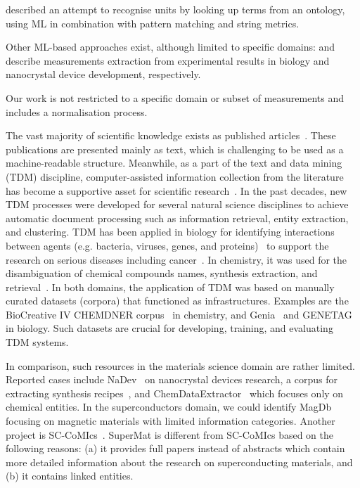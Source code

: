 \documentclass[12pt, a4paper]{report}
\begin{document}
\cite{berrahou2013extract} described an attempt to recognise units by looking up terms from an ontology, using ML in combination with pattern matching and string metrics. 

Other ML-based approaches exist, although limited to specific domains: \cite{kang_extracting_2013} and \cite{dieb2015framework} describe measurements extraction from experimental results in biology and nanocrystal device development, respectively. 

Our work is not restricted to a specific domain or subset of measurements and includes a normalisation process. 


The vast majority of scientific knowledge exists as published articles~\cite{Grigas2017JustGI, Khabsa2014TheNO, OrduaMalea2015MethodsFE, Bjrk2009ScientificJP}. 
These publications are presented mainly as text, which is challenging to be used as a machine-readable structure. 
Meanwhile, as a part of the text and data mining (TDM) discipline, computer-assisted information collection from the literature has become a supportive asset for scientific research~\cite{doi:10.1063/5.0021106}. 
In the past decades, new TDM processes were developed for several natural science disciplines to achieve automatic document processing such as information retrieval, entity extraction, and clustering.  
TDM has been applied in biology for identifying interactions between agents (e.g. bacteria, viruses, genes, and proteins)~\cite{10.1371/journal.pone.0004554, Krallinger2010, Krallinger2009ExtractionOH} to support the research on serious diseases including cancer~\cite{Krasnitz2019CancerB}. 
In chemistry, it was used for the disambiguation of chemical compounds names, synthesis extraction, and retrieval~\cite{Hawizy2011ChemicalTaggerAT}.
In both domains, the application of TDM was based on manually curated datasets (corpora) that functioned as infrastructures. Examples are the BioCreative IV CHEMDNER corpus~\cite{Krallinger2015TheCC} in chemistry, and Genia~\cite{Kim2003GENIAC} and GENETAG~\cite{Tanabe2005GENETAGAT, Ohta2009IncorporatingGA} in biology. Such datasets are crucial for developing, training, and evaluating TDM systems.

In comparison, such resources in the materials science domain are rather limited. 
Reported cases include NaDev~\cite{Dieb2016} on nanocrystal devices research, a corpus for extracting synthesis recipes~\cite{kononova_text-mined_2019}, and ChemDataExtractor~\cite{court2018auto} which focuses only on chemical entities. In the superconductors domain, we could identify MagDb~\cite{court_magnetic_2020} focusing on magnetic materials with limited information categories. Another project is SC-CoMIcs~\cite{yamaguchi-etal-2020-sc}.
SuperMat is different from SC-CoMIcs based on the following reasons: (a) it provides full papers instead of abstracts which contain more detailed information about the research on superconducting materials, and (b) it contains linked entities. 
\end{document}
